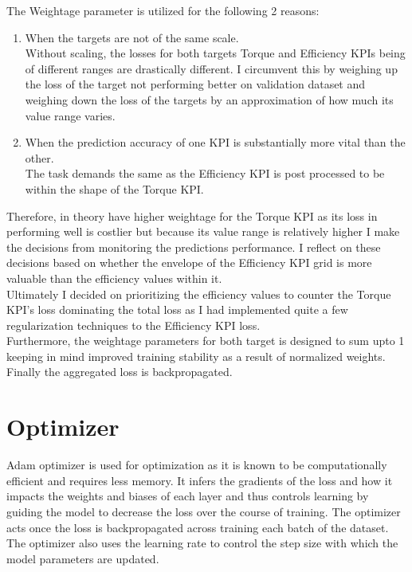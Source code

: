 \documentclass{report} %
\begin{document}
The Weightage parameter is utilized for the following 2 reasons:
\begin{enumerate}[nosep]
    \item  When the targets are not of the same scale. \\
    Without scaling, the losses for both targets Torque and Efficiency \ac{KPI}s being of different ranges are drastically different.
    I circumvent this by weighing up the loss of the target not performing better on validation dataset and weighing down the loss of the 
    targets by an approximation of how much its value range varies.
    \item When the prediction accuracy of one \ac{KPI} is substantially more vital than the other. \\
    The task demands the same as the Efficiency \ac{KPI} is post processed to be within the shape of the Torque \ac{KPI}. \\

\end{enumerate}

Therefore, in theory have higher weightage for the Torque \ac{KPI} as its loss in performing well is costlier but because its value range is relatively higher I make the 
decisions from monitoring the predictions performance.
I reflect on these decisions based on whether the envelope of the Efficiency \ac{KPI} grid is more valuable than the efficiency values within it.\\
Ultimately I decided on prioritizing the efficiency values to counter the Torque \ac{KPI}'s loss dominating the total loss as I had implemented 
quite a few regularization techniques to the Efficiency \ac{KPI} loss.\\
Furthermore, the weightage parameters for both target is designed to sum upto 1 keeping in mind improved training stability as a result of normalized weights. \\

Finally the aggregated loss is backpropagated.

\section{Optimizer}\label{sec:Optimizer}

Adam optimizer is used for optimization as it is known to be computationally efficient and requires less memory. 
It infers the gradients of the loss and how it impacts the weights and biases of each layer and thus controls learning by guiding the model to decrease the loss over the course of training. 
The optimizer acts once the loss is backpropagated across training each batch of the dataset.
The optimizer also uses the learning rate to control the step size with which the model parameters are updated.
\end{document}
